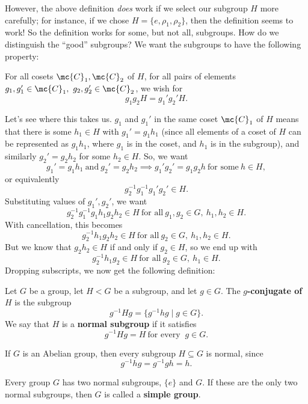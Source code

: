 \documentclass[math1530-lecture-notes]{subfiles}
\begin{document}
However, the above definition \textit{does} work if we select our subgroup $H$ more carefully; for
instance, if we chose $H=\{ e,\rho_1,\rho_2 \}$, then the definition seems to work! So the
definition works for some, but not all, subgroups. How do we distinguish the ``good'' subgroups? We
want the subgroups to have the following property: \begin{center}
  For all cosets $\mc{C}_1, \mc{C}_2$ of $H$, for all pairs of elements $g_1,g_1'\in \mc{C}_1,\
  g_2,g_2'\in \mc{C}_2$, we wish for \[
    g_1g_2H=g_1'g_2'H
  .\] 
\end{center}

Let's see where this takes us. $g_1$ and $g_1'$ in the same coset $\mc{C}_1$ of $H$ means that there
is some $h_1\in H$ with $g_1'=g_1h_1$ (since all elements of a coset of $H$ can be represented as
$g_1h_1$, where $g_1$ is in the coset, and $h_1$ is in the subgroup), and similarly $g_2'=g_2h_2$
for some $h_2\in H$. So, we want \[
  g_1'=g_1h_1~\text{and}~g_2'=g_2h_2\implies g_1'g_2'=g_1g_2h~\text{for some}~h\in H
,\] or equivalently \[
  g_2^{-1}g_1^{-1}g_1'g_2'\in H
.\] Substituting values of $g_1', g_2'$, we want \[
  g_2^{-1}g_1^{-1}g_1h_1g_2h_2\in H ~\text{for all}~g_1,g_2\in G,\ h_1,h_2\in H
.\] With cancellation, this becomes \[
  g_2^{-1}h_1g_2h_2\in H~\text{for all}~g_2\in G,\ h_1,h_2\in H
.\] But we know that $g_2h_2\in H$ if and only if $g_2\in H$, so we end up with \[
  g_2^{-1}h_1g_2\in H~\text{for all}~g_2\in G,\ h_1\in H
.\] Dropping subscripts, we now get the following definition:
\begin{definition}{}
  Let $G$ be a group, let $H < G$ be a subgroup, and let $g\in G$. The \textbf{$g$-conjugate of $H$}
  is the subgroup \[
    g^{-1}Hg=\{g^{-1}hg\mid g\in G\} 
  .\] We say that $H$ is a \textbf{normal subgroup} if it satisfies \[
    g^{-1}Hg=H~\text{for every }~g\in G
  .\] 
\end{definition}

\begin{example}
  If $G$ is an Abelian group, then every subgroup $H\subseteq G$ is normal, since \[
    g^{-1}hg=g^{-1}gh=h
  .\] 
\end{example}

\begin{definition}{}
  Every group $G$ has two normal subgroups, $\{ e \}$ and $G$. If these are the only two normal
  subgroups, then $G$ is called a \textbf{simple group}.
\end{definition}
\end{document}
